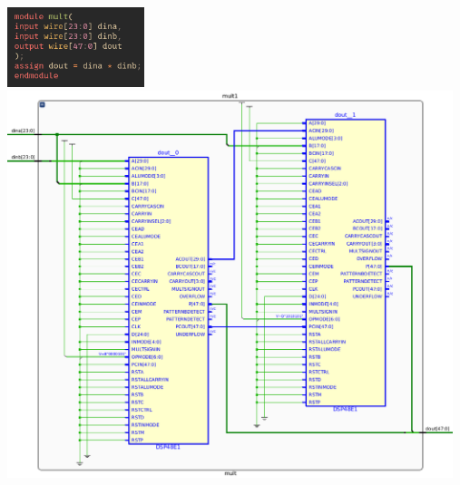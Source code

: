 \documentclass{article}
\begin{document}
        {
            \centering
            \includegraphics[valign=c, width=4.0cm]{figures/mult_synthesis.png}
            \includegraphics[valign=c, width=13.0cm]{figures/dsp_synthesis.png}
            \label{mult_synthesis}
        }
\end{document}
